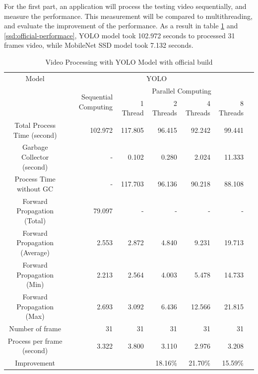             For the first part, an application will process the testing video sequentially, and measure the performance.
            This measurement will be compared to multithreading, and evaluate the improvement of the performance.
            As a result in table \ref{yolo:official-performace} and \ref{ssd:official-performace},
            YOLO model took 102.972 seconds to processed 31 frames video, while MobileNet SSD model took 7.132 seconds.

            \begin{table}[!htp]\centering
                \scriptsize
                \begin{tabular}{lrrrrrrr}\toprule
                    \multicolumn{2}{c}{Model} &\multicolumn{5}{c}{YOLO} \\\cmidrule{1-7}
                    \multicolumn{2}{c}{\multirow{2}{*}{}} &\multirow{2}{*}{Sequential Computing} &\multicolumn{4}{c}{Parallel Computing} \\\cmidrule{4-7}
                    & & &1 Thread &2 Threads &4 Threads &8 Threads \\\midrule
                    \multicolumn{2}{c}{Total Process Time (second)} &102.972 &117.805 &96.415 &92.242 &99.441 \\
                    \multicolumn{2}{c}{Garbage Collector (second)} &- &0.102 &0.280 &2.024 &11.333 \\
                    \multicolumn{2}{c}{Process Time without GC} &- &117.703 &96.136 &90.218 &88.108 \\
                    \multicolumn{2}{c}{Forward Propagation (Total)} &79.097 &- &- &- &- \\
                    \multicolumn{2}{c}{Forward Propagation (Average)} &2.553 &2.872 &4.840 &9.231 &19.713 \\
                    \multicolumn{2}{c}{Forward Propagation (Min)} &2.213 &2.564 &4.003 &5.478 &14.733 \\
                    \multicolumn{2}{c}{Forward Propagation (Max)} &2.693 &3.092 &6.436 &12.566 &21.815 \\
                    \multicolumn{2}{c}{Number of frame} &31 &31 &31 &31 &31 \\
                    \multicolumn{2}{c}{Process per frame (second)} &3.322 &3.800 &3.110 &2.976 &3.208 \\
                    \multicolumn{2}{c}{Improvement} & & &18.16\% &21.70\% &15.59\% \\
                    \bottomrule
                \end{tabular}

                \caption{Video Processing with YOLO Model with official build}\label{yolo:official-performace}
            \end{table}

